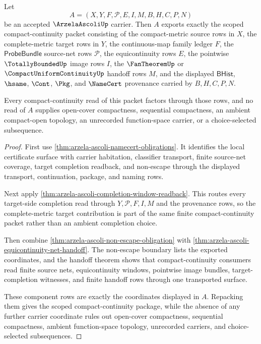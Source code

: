 \begin{theorem}
\label{thm:arzela-ascoli-scoped-compact-continuity-package}
Let
$$
A=(X,Y,F,\mathcal{P},E,I,M,B,H,C,P,N)
$$
be an accepted $\ArzelaAscoliUp$ carrier. Then $A$ exports exactly the scoped compact-continuity packet consisting of the compact-metric source rows in $X$, the complete-metric target rows in $Y$, the continuous-map family ledger $F$, the $\mathsf{ProbeBundle}$ source-net rows $\mathcal{P}$, the equicontinuity rows $E$, the pointwise $\TotallyBoundedUp$ image rows $I$, the $\FanTheoremUp$ or $\CompactUniformContinuityUp$ handoff rows $M$, and the displayed $\mathsf{BHist}$, $\hsame$, $\Cont$, $\Pkg$, and $\NameCert$ provenance carried by $B,H,C,P,N$.

Every compact-continuity read of this packet factors through those rows, and no read of $A$ supplies open-cover compactness, sequential compactness, an ambient compact-open topology, an unrecorded function-space carrier, or a choice-selected subsequence.
\end{theorem}
\begin{proof}
First use \autoref{thm:arzela-ascoli-namecert-obligations}. It identifies the local certificate surface with carrier habitation, classifier transport, finite source-net coverage, target completion readback, and non-escape through the displayed transport, continuation, package, and naming rows.

Next apply \autoref{thm:arzela-ascoli-completion-window-readback}. This routes every target-side completion read through $Y,\mathcal{P},F,I,M$ and the provenance rows, so the complete-metric target contribution is part of the same finite compact-continuity packet rather than an ambient completion choice.

Then combine \autoref{thm:arzela-ascoli-non-escape-obligation} with \autoref{thm:arzela-ascoli-equicontinuity-net-handoff}. The non-escape boundary lists the exported coordinates, and the handoff theorem shows that compact-continuity consumers read finite source nets, equicontinuity windows, pointwise image bundles, target-completion witnesses, and finite handoff rows through one transported surface.

These component rows are exactly the coordinates displayed in $A$. Repacking them gives the scoped compact-continuity package, while the absence of any further carrier coordinate rules out open-cover compactness, sequential compactness, ambient function-space topology, unrecorded carriers, and choice-selected subsequences.
\end{proof}

